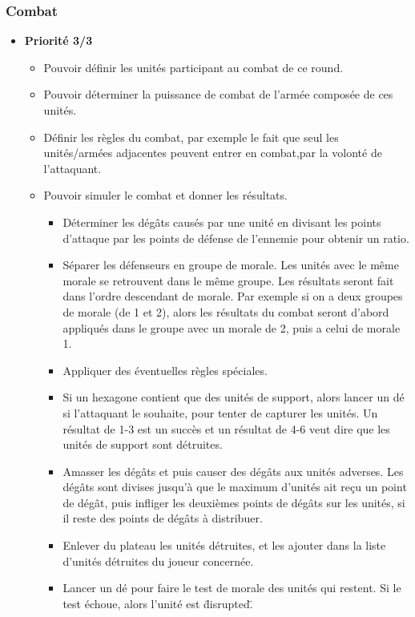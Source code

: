 \subsubsection{Combat}
\begin{itemize}
    \item \textbf{Priorité 3/3}
    \begin{itemize}
        \item Pouvoir définir les unités participant au combat de ce round.
        \item Pouvoir déterminer la puissance de combat de l'armée composée de ces unités.
        \item Définir les règles du combat, par exemple le fait que seul les unités/armées adjacentes peuvent entrer en combat,par la volonté de l'attaquant.
        \item Pouvoir simuler le combat et donner les résultats.
        \begin{itemize}
            \item Déterminer les dégâts causés par une unité en divisant les points d'attaque par les points de défense de l'ennemie pour obtenir un ratio.
            \item Séparer les défenseurs en groupe de morale. Les unités avec le même morale se retrouvent dans le même groupe. Les résultats seront fait dans l'ordre descendant de morale. Par exemple si on a deux groupes de morale (de 1 et 2), alors les résultats du combat seront d'abord appliqués dans le groupe avec un morale de 2, puis a celui de morale 1.
            \item Appliquer des éventuelles règles spéciales.
            \item Si un hexagone contient que des unités de support, alors lancer un dé si l'attaquant le souhaite, pour tenter de capturer les unités. Un résultat de 1-3 est un succès et un résultat de 4-6 veut dire que les unités de support sont détruites.
            \item Amasser les dégâts et puis causer des dégâts aux unités adverses. Les dégâts sont divises jusqu'à que le maximum d'unités ait reçu un point de dégât, puis infliger les deuxièmes points de dégâts sur les unités, si il reste des points de dégâts à distribuer.
            \item Enlever du plateau les unités détruites, et les ajouter dans la liste d'unités détruites du joueur concernée.
            \item Lancer un dé pour faire le test de morale des unités qui restent. Si le test échoue, alors l'unité est \"disrupted\".

\end{itemize}
\end{itemize}
\end{itemize}
